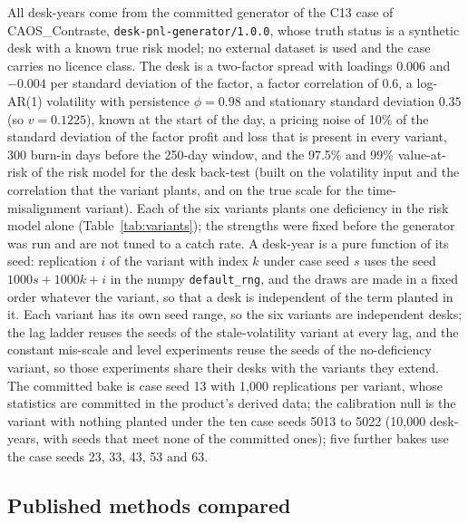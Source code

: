 All desk-years come from the committed generator of the C13 case of CAOS\_Contraste, \texttt{desk-pnl-generator/1.0.0}, whose truth status is a synthetic desk with a known true risk model; no external dataset is used and the case carries no licence class.
The desk is a two-factor spread with loadings $0.006$ and $-0.004$ per standard deviation of the factor, a factor correlation of $0.6$, a log-AR(1) volatility with persistence $\phi=0.98$ and stationary standard deviation $0.35$ (so $v=0.1225$), known at the start of the day, a pricing noise of 10\% of the standard deviation of the factor profit and loss that is present in every variant, 300 burn-in days before the 250-day window, and the 97.5\% and 99\% value-at-risk of the risk model for the desk back-test (built on the volatility input and the correlation that the variant plants, and on the true scale for the time-misalignment variant).
Each of the six variants plants one deficiency in the risk model alone (Table~\ref{tab:variants}); the strengths were fixed before the generator was run and are not tuned to a catch rate.
A desk-year is a pure function of its seed: replication $i$ of the variant with index $k$ under case seed $s$ uses the seed $1000s+1000k+i$ in the numpy \texttt{default\_rng}, and the draws are made in a fixed order whatever the variant, so that a desk is independent of the term planted in it.
Each variant has its own seed range, so the six variants are independent desks; the lag ladder reuses the seeds of the stale-volatility variant at every lag, and the constant mis-scale and level experiments reuse the seeds of the no-deficiency variant, so those experiments share their desks with the variants they extend.
The committed bake is case seed 13 with 1,000 replications per variant, whose statistics are committed in the product's derived data; the calibration null is the variant with nothing planted under the ten case seeds 5013 to 5022 (10,000 desk-years, with seeds that meet none of the committed ones); five further bakes use the case seeds 23, 33, 43, 53 and 63.



\subsection{Published methods compared}
\label{sec:design-comparators}

